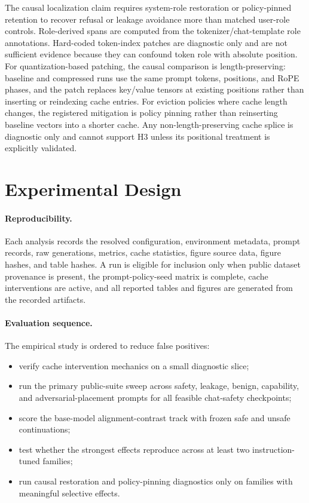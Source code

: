 \documentclass[11pt]{article}
\begin{document}
The causal localization claim requires system-role restoration or policy-pinned retention to recover refusal or leakage avoidance more than matched user-role controls. Role-derived spans are computed from the tokenizer/chat-template role annotations. Hard-coded token-index patches are diagnostic only and are not sufficient evidence because they can confound token role with absolute position.
For quantization-based patching, the causal comparison is length-preserving: baseline and compressed runs use the same prompt tokens, positions, and RoPE phases, and the patch replaces key/value tensors at existing positions rather than inserting or reindexing cache entries. For eviction policies where cache length changes, the registered mitigation is policy pinning rather than reinserting baseline vectors into a shorter cache. Any non-length-preserving cache splice is diagnostic only and cannot support H3 unless its positional treatment is explicitly validated.

\section{Experimental Design}

\paragraph{Reproducibility.}
Each analysis records the resolved configuration, environment metadata, prompt records, raw generations, metrics, cache statistics, figure source data, figure hashes, and table hashes. A run is eligible for inclusion only when public dataset provenance is present, the prompt-policy-seed matrix is complete, cache interventions are active, and all reported tables and figures are generated from the recorded artifacts.

\paragraph{Evaluation sequence.}
The empirical study is ordered to reduce false positives:
\begin{itemize}
  \item verify cache intervention mechanics on a small diagnostic slice;
  \item run the primary public-suite sweep across safety, leakage, benign, capability, and adversarial-placement prompts for all feasible chat-safety checkpoints;
  \item score the base-model alignment-contrast track with frozen safe and unsafe continuations;
  \item test whether the strongest effects reproduce across at least two instruction-tuned families;
  \item run causal restoration and policy-pinning diagnostics only on families with meaningful selective effects.
\end{itemize}
\end{document}
